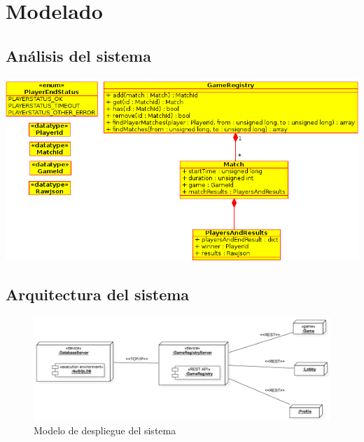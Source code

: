 \chapter{Modelado}

\section{Análisis del sistema}
 \begin{center}
  \includegraphics[scale=0.6]{./class_diagram.png}
 \end{center}


\section{Arquitectura del sistema}
\begin{figure}[h!]
 \includegraphics[scale=0.5]{diagrams/deployment_diagram.png}
 \caption{Modelo de despliegue del sistema}
 \label{fig:arquitectura}
\end{figure}

